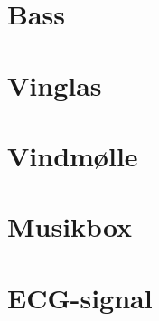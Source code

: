 \section{Bass}



\section{Vinglas}


\section{Vindmølle}



\section{Musikbox}


\section{ECG-signal}

